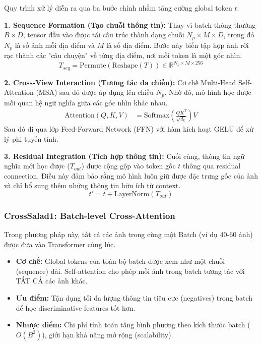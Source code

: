 \documentclass[12pt,a4paper]{article}
\begin{document}
    Quy trình xử lý diễn ra qua ba bước chính nhằm tăng cường global token $t$:

    \textbf{1. Sequence Formation (Tạo chuỗi thông tin):}
    Thay vì batch thông thường $B \times D$, tensor đầu vào được tái cấu trúc thành dạng chuỗi $N_p \times M \times D$, trong đó $N_p$ là số ảnh mỗi địa điểm và $M$ là số địa điểm. Bước này biến tập hợp ảnh rời rạc thành các "câu chuyện" về từng địa điểm, nơi mỗi token là một góc nhìn.
    \begin{equation}
        T_{seq} = \text{Permute}(\text{Reshape}(T)) \in \mathbb{R}^{N_p \times M \times 256}
    \end{equation}

    \textbf{2. Cross-View Interaction (Tương tác đa chiều):}
    Cơ chế Multi-Head Self-Attention (MSA) sau đó được áp dụng lên chiều $N_p$. Nhờ đó, mô hình học được mối quan hệ ngữ nghĩa giữa các góc nhìn khác nhau.
    \begin{align}
        \text{Attention}(Q,K,V) &= \text{Softmax}\left(\frac{QK^T}{\sqrt{d_k}}\right)V
    \end{align}
    Sau đó đi qua lớp Feed-Forward Network (FFN) với hàm kích hoạt GELU để xử lý phi tuyến tính.

    \textbf{3. Residual Integration (Tích hợp thông tin):}
    Cuối cùng, thông tin ngữ nghĩa mới học được ($T_{out}$) được cộng gộp vào token gốc $t$ thông qua residual connection. Điều này đảm bảo rằng mô hình luôn giữ được đặc trưng gốc của ảnh và chỉ bổ sung thêm những thông tin hữu ích từ context.
    \begin{equation}
        t' = t + \text{LayerNorm}(T_{out})
    \end{equation}

    \subsubsection{CrossSalad1: Batch-level Cross-Attention}
    Trong phương pháp này, tất cả các ảnh trong cùng một Batch (ví dụ 40-60 ảnh) được đưa vào Transformer cùng lúc.
    \begin{itemize}
        \item \textbf{Cơ chế:} Global tokens của toàn bộ batch được xem như một chuỗi (sequence) dài. Self-attention cho phép mỗi ảnh trong batch tương tác với TẤT CẢ các ảnh khác.
        \item \textbf{Ưu điểm:} Tận dụng tối đa lượng thông tin tiêu cực (negatives) trong batch để học discriminative features tốt hơn.
        \item \textbf{Nhược điểm:} Chi phí tính toán tăng bình phương theo kích thước batch ($O(B^2)$), giới hạn khả năng mở rộng (scalability).
    \end{itemize}
\end{document}
